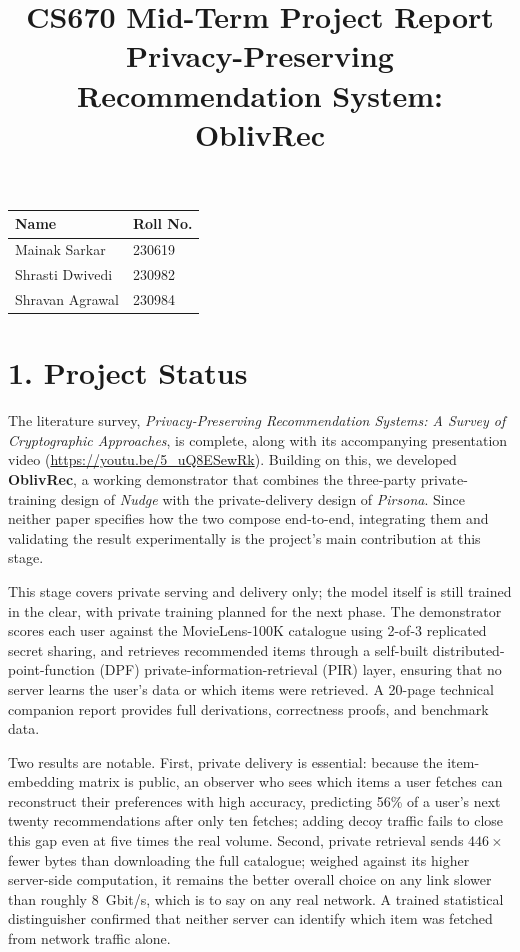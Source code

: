 \documentclass[11pt]{article}
\title{\vspace{-1.5em}CS670 Mid-Term Project Report\\
\large Privacy-Preserving Recommendation System: OblivRec}
\author{}
\date{}
\begin{document}
\maketitle
\vspace{-3em}

\begin{center}
\begin{tabular}{ll}
\toprule
\textbf{Name} & \textbf{Roll No.} \\
\midrule
Mainak Sarkar    & 230619 \\
Shrasti Dwivedi  & 230982 \\
Shravan Agrawal  & 230984 \\
\bottomrule
\end{tabular}
\end{center}

\vspace{0.5em}
\section*{1. Project Status}

The literature survey, \emph{Privacy-Preserving Recommendation Systems: A Survey of Cryptographic Approaches}, is complete, along with its accompanying presentation video (\url{https://youtu.be/5_uQ8ESewRk}). Building on this, we developed \textbf{OblivRec}, a working demonstrator that combines the three-party private-training design of \emph{Nudge} with the private-delivery design of \emph{Pirsona}. Since neither paper specifies how the two compose end-to-end, integrating them and validating the result experimentally is the project's main contribution at this stage.

This stage covers private serving and delivery only; the model itself is still trained in the clear, with private training planned for the next phase. The demonstrator scores each user against the MovieLens-100K catalogue using 2-of-3 replicated secret sharing, and retrieves recommended items through a self-built distributed-point-function (DPF) private-information-retrieval (PIR) layer, ensuring that no server learns the user's data or which items were retrieved. A 20-page technical companion report provides full derivations, correctness proofs, and benchmark data.

Two results are notable. First, private delivery is essential: because the item-embedding matrix is public, an observer who sees which items a user fetches can reconstruct their preferences with high accuracy, predicting 56\% of a user's next twenty recommendations after only ten fetches; adding decoy traffic fails to close this gap even at five times the real volume. Second, private retrieval sends $446\times$ fewer bytes than downloading the full catalogue; weighed against its higher server-side computation, it remains the better overall choice on any link slower than roughly 8~Gbit/s, which is to say on any real network. A trained statistical distinguisher confirmed that neither server can identify which item was fetched from network traffic alone.
\end{document}
